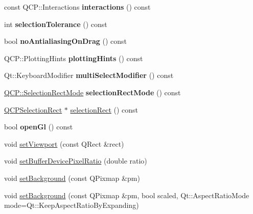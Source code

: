 \begin{DoxyCompactItemize}
\mbox{\label{class_q_custom_plot_a2c78c5fd2943c148ab76652801d3f2dc}} 
const Q\+C\+P\+::\+Interactions {\bfseries interactions} () const
\item 
\mbox{\label{class_q_custom_plot_a5441d11013afeaf4b8f2ea06e8624a25}} 
int {\bfseries selection\+Tolerance} () const
\item 
\mbox{\label{class_q_custom_plot_aca3f01f903fb250a3dd27104d92830be}} 
bool {\bfseries no\+Antialiasing\+On\+Drag} () const
\item 
\mbox{\label{class_q_custom_plot_ac724f4075822f74f7b676a790095b877}} 
Q\+C\+P\+::\+Plotting\+Hints {\bfseries plotting\+Hints} () const
\item 
\mbox{\label{class_q_custom_plot_a28182402ed11609c9a429f0788162d18}} 
Qt\+::\+Keyboard\+Modifier {\bfseries multi\+Select\+Modifier} () const
\item 
\mbox{\label{class_q_custom_plot_a6e53c402de2770a978dffa5584c05b27}} 
\mbox{\hyperlink{namespace_q_c_p_ac9aa4d6d81ac76b094f9af9ad2d3aacf}{Q\+C\+P\+::\+Selection\+Rect\+Mode}} {\bfseries selection\+Rect\+Mode} () const
\item 
\mbox{\hyperlink{class_q_c_p_selection_rect}{Q\+C\+P\+Selection\+Rect}} $\ast$ \mbox{\hyperlink{class_q_custom_plot_ad7df2bcbba307e644db383b449e31efd}{selection\+Rect}} () const
\item 
\mbox{\label{class_q_custom_plot_abe5556ac80dc0140fd57f2b2f94a1f0e}} 
bool {\bfseries open\+Gl} () const
\item 
void \mbox{\hyperlink{class_q_custom_plot_a3f9bc4b939dd8aaba9339fd09f273fc4}{set\+Viewport}} (const Q\+Rect \&rect)
\item 
void \mbox{\hyperlink{class_q_custom_plot_a159162653ad6f8b8bf21263ba5787215}{set\+Buffer\+Device\+Pixel\+Ratio}} (double ratio)
\item 
void \mbox{\hyperlink{class_q_custom_plot_a130358592cfca353ff3cf5571b49fb00}{set\+Background}} (const Q\+Pixmap \&pm)
\item 
void \mbox{\hyperlink{class_q_custom_plot_a8513971d6aa24d8b0d6a68d45b542130}{set\+Background}} (const Q\+Pixmap \&pm, bool scaled, Qt\+::\+Aspect\+Ratio\+Mode mode=Qt\+::\+Keep\+Aspect\+Ratio\+By\+Expanding)

\end{DoxyCompactItemize}
